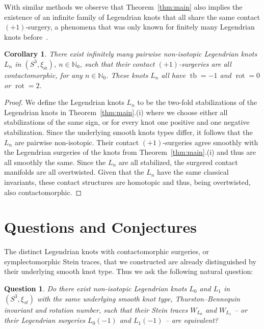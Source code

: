 \documentclass[11pt]{amsart} %
\DeclareMathOperator{\tb}{tb}
\DeclareMathOperator{\rot}{rot}
\newcommand{\N}{\mathbb{N}}
\newcommand{\xist}{\xi_{\mathrm{st}}}
\theoremstyle{plain}
\newtheorem{cor}[Theorem]{Corollary}
\newtheorem{ques}[Theorem]{Question}
\theoremstyle{definition}
\begin{document}
With similar methods we observe that Theorem~\ref{thm:main} also implies the existence of an infinite family of Legendrian knots that all share the same contact $(+1)$-surgery, a phenomena that was only known for finitely many Legendrian knots before~\cite{Etnyre08}.

\begin{cor}
	There exist infinitely many pairwise non-isotopic Legendrian knots $L_n$ in $(S^3,\xist)$, $n\in\N_0$, such that their contact $(+1)$-surgeries are all contactomorphic, for any $n \in \N_0$. These knots $L_n$ all have $\tb=-1$ and $\rot=0$ or $\rot=2$.
\end{cor}

\begin{proof}
	We define the Legendrian knots $L_n$ to be the two-fold stabilizations of the Legendrian knots in Theorem~\ref{thm:main}.(i) where we choose either all stabilizations of the same sign, or for every knot one positive and one negative stabilization. Since the underlying smooth knots types differ, it follows that the $L_n$ are pairwise non-isotopic. Their contact $(+1)$-surgeries agree smoothly with the Legendrian surgeries of the knots from Theorem~\ref{thm:main}.(i) and thus are all smoothly the same. Since the $L_n$ are all stabilized, the surgered contact manifolds are all overtwisted. Given that the $L_n$ have the same classical invariants, these contact structures are homotopic and thus, being overtwisted, also contactomorphic.
\end{proof}

\section{Questions and Conjectures}\label{sec:QuestionsConj}

The distinct Legendrian knots with contactomorphic surgeries, or symplectomorphic Stein traces, that we constructed are already distinguished by their underlying smooth knot type. Thus we ask the following natural question:

\begin{ques}\label{ques:classical}
	Do there exist non-isotopic Legendrian knots $L_0$ and $L_1$ in $(S^3,\xi_{st})$ with the same underlying smooth knot type, Thurston--Bennequin invariant and rotation number, such that their Stein traces $W_{L_0}$ and $W_{L_1}$ -- or their Legendrian surgeries $L_0(-1)$ and $L_1(-1)$ -- are equivalent?
\end{ques}
\end{document}
